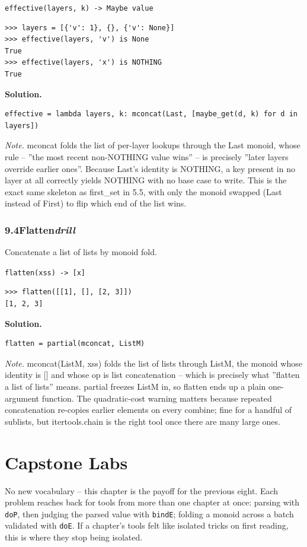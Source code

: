 \documentclass[10pt,letterpaper]{book}
\begin{document}
\noindent\texttt{effective(layers, k) -> Maybe value}
\begin{lstlisting}[style=ex]
>>> layers = [{'v': 1}, {}, {'v': None}]
>>> effective(layers, 'v') is None
True
>>> effective(layers, 'x') is NOTHING
True
\end{lstlisting}
\noindent\textbf{Solution.}
\begin{lstlisting}[style=code]
effective = lambda layers, k: mconcat(Last, [maybe_get(d, k) for d in layers])
\end{lstlisting}
\noindent\textit{Note.} mconcat folds the list of per-layer lookups through the Last monoid, whose rule -- ''the most recent non-NOTHING value wins'' -- is precisely ''later layers override earlier ones''. Because Last's identity is NOTHING, a key present in no layer at all correctly yields NOTHING with no base case to write. This is the exact same skeleton as first\_set in 5.5, with only the monoid swapped (Last instead of First) to flip which end of the list wins.

\subsection*{9.4\quad Flatten\hfill\textnormal{\textit{drill}}}
Concatenate a list of lists by monoid fold.

\noindent\texttt{flatten(xss) -> [x]}
\begin{lstlisting}[style=ex]
>>> flatten([[1], [], [2, 3]])
[1, 2, 3]
\end{lstlisting}
\noindent\textbf{Solution.}
\begin{lstlisting}[style=code]
flatten = partial(mconcat, ListM)
\end{lstlisting}
\noindent\textit{Note.} mconcat(ListM, xss) folds the list of lists through ListM, the monoid whose identity is [] and whose op is list concatenation -- which is precisely what ''flatten a list of lists'' means. partial freezes ListM in, so flatten ends up a plain one-argument function. The quadratic-cost warning matters because repeated concatenation re-copies earlier elements on every combine; fine for a handful of sublists, but itertools.chain is the right tool once there are many large ones.

\clearpage
\chapter{Capstone Labs}

No new vocabulary -- this chapter is the payoff for the previous eight.
Each problem reaches back for tools from more than one chapter at once:
parsing with \texttt{doP}, then judging the parsed value with
\texttt{bindE}; folding a monoid across a batch validated with
\texttt{doE}. If a chapter's tools felt like isolated tricks on first
reading, this is where they stop being isolated.
\end{document}
